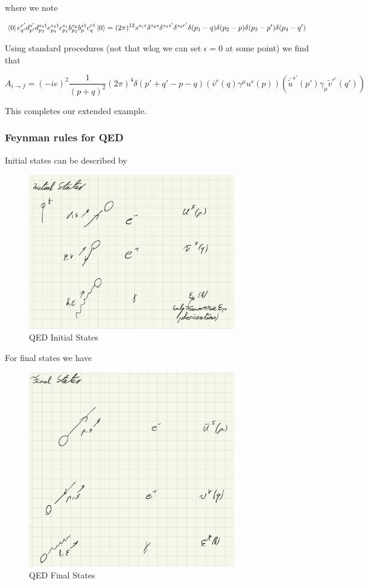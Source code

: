 \documentclass{article}
\theoremstyle{definition}
\begin{document}
where we note

$$ 
\bra{0} e_{q'}^{r'} d_{p'}^{s'} d_{p_3}^{s_3 \dagger} e_{p_4}^{s_4 \dagger}
c_{p_1}^{s_1} b_{p_2}^{s_2} b_p^{s \dagger} c_q^{r \dagger} \ket{0}
= (2\pi)^{12} s^{s_1 r} \delta^{s_2 s} \delta^{s_3 s'} \delta^{s_4 r'}
\delta(p_1 - q) \delta(p_2 - p) \delta(p_3 - p') \delta(p_4 - q') $$

Using standard procedures (not that wlog we can set $\epsilon = 0$ at some
point) we find that

$$ A_{i \to f} = (-ie)^2 \frac{1}{(p + q)^2} (2\pi)^4 \delta(p' + q' - p - q)
(\bar{v}^r(q) \gamma^\mu u^s(p)) (\bar{\tilde{u}}^{s'}(p') \gamma_\mu
\tilde{v}^{r'}(q')) $$

This completes our extended example.

\subsubsection{Feynman rules for QED}

Initial states can be described by

\begin{figure}[H]
  \centering
  \includegraphics[width=9cm]{res/QFT/qed_initial_states}
  \caption{QED Initial States}
  \label{qed_initial_states}
\end{figure}

For final states we have

\begin{figure}[H]
  \centering
  \includegraphics[width=9cm]{res/QFT/qed_final_states}
  \caption{QED Final States}
  \label{qed_final_states}
\end{figure}
\end{document}

